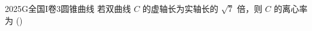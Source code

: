 
\begin{problem}{2025}{G}{全国I卷}{3}{圆锥曲线}
若双曲线 $C$ 的虚轴长为实轴长的 $\sqrt{7}$ 倍，则 $C$ 的离心率为
(\hspace{1cm})
\begin{choices}
\end{choices}
\end{problem}